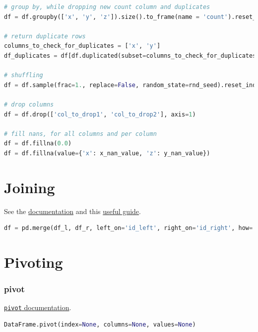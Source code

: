 \begin{lstlisting}[language=Python]
# group by, while dropping new count column and duplicates
df = df.groupby(['x', 'y', 'z']).size().to_frame(name = 'count').reset_index().drop(['count'], axis=1).drop_duplicates()

# return duplicate rows
columns_to_check_for_duplicates = ['x', 'y']
df_duplicates = df[df.duplicated(subset=columns_to_check_for_duplicates, keep=False)]

# shuffling
df = df.sample(frac=1., replace=False, random_state=rnd_seed).reset_index(drop=True)

# drop columns
df = df.drop(['col_to_drop1', 'col_to_drop2'], axis=1)

# fill nans, for all columns and per column
df = df.fillna(0.0)
df = df.fillna(value={'x': x_nan_value, 'z': y_nan_value})
\end{lstlisting}

\clearpage

\section{Joining}
\label{pandas:join}

\noindent See the \href{https://pandas.pydata.org/pandas-docs/stable/user_guide/merging.html}{documentation} and this \href{http://chrisalbon.com/python/data_wrangling/pandas_join_merge_dataframe/}{useful guide}.

\begin{lstlisting}[language=Python]
df = pd.merge(df_l, df_r, left_on='id_left', right_on='id_right', how='left')
\end{lstlisting}

\section{Pivoting}
\label{pandas:pivoting}

\subsubsection{pivot}
\label{pandas:pivoting:pivot}

\noindent \href{http://pandas.pydata.org/pandas-docs/stable/reference/api/pandas.DataFrame.pivot.html}{\texttt{pivot} documentation}.

\begin{lstlisting}[language=Python]
DataFrame.pivot(index=None, columns=None, values=None)
\end{lstlisting}

